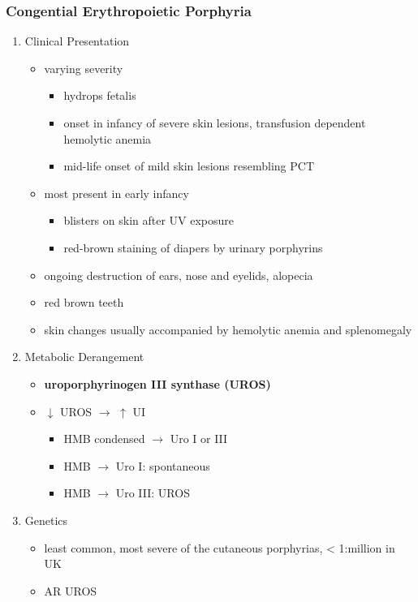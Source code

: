 \documentclass[12pt]{scrartcl}
\begin{document}
\subsubsection{Congential Erythropoietic Porphyria}
\label{sec:org0123853}
\begin{enumerate}
\item Clinical Presentation
\label{sec:org32cdd7b}
\begin{itemize}
\item varying severity
\begin{itemize}
\item hydrops fetalis
\item onset in infancy of severe skin lesions, transfusion dependent
hemolytic anemia
\item mid-life onset of mild skin lesions resembling PCT
\end{itemize}
\item most present in early infancy
\begin{itemize}
\item blisters on skin after UV exposure
\item red-brown staining of diapers by urinary porphyrins
\end{itemize}
\item ongoing destruction of ears, nose and eyelids, alopecia
\item red brown teeth
\item skin changes usually accompanied by hemolytic anemia and splenomegaly
\end{itemize}
\item Metabolic Derangement
\label{sec:orgd4c4c00}
\begin{itemize}
\item \textbf{uroporphyrinogen III synthase (UROS)}
\item \(\downarrow\) UROS \(\to\) \(\uparrow\) UI
\begin{itemize}
\item HMB condensed \(\to\) Uro I or III
\item HMB \(\rightarrow\) Uro I: spontaneous
\item HMB \(\rightarrow\) Uro III: UROS
\end{itemize}
\end{itemize}
\item Genetics
\label{sec:org2b90e0b}
\begin{itemize}
\item least common, most severe of the cutaneous porphyrias, < 1:million in UK
\item AR UROS

\end{itemize}
\end{enumerate}
\end{document}
